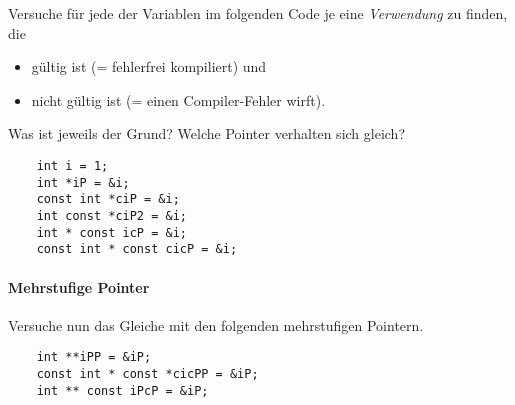 Versuche für jede der Variablen im folgenden Code je eine \emph{Verwendung} zu finden, die  
\begin{itemize}
\item gültig ist (= fehlerfrei kompiliert) und
\item nicht gültig ist (= einen Compiler-Fehler wirft).
\end{itemize}


Was ist jeweils der Grund?
Welche Pointer verhalten sich gleich?

\begin{lstlisting}
    int i = 1;    
    int *iP = &i;
    const int *ciP = &i;
    int const *ciP2 = &i;
    int * const icP = &i;    
    const int * const cicP = &i;
\end{lstlisting}

\paragraph{Mehrstufige Pointer}

Versuche nun das Gleiche mit den folgenden mehrstufigen Pointern.

\begin{lstlisting}
    int **iPP = &iP;
    const int * const *cicPP = &iP;
    int ** const iPcP = &iP;
\end{lstlisting}

